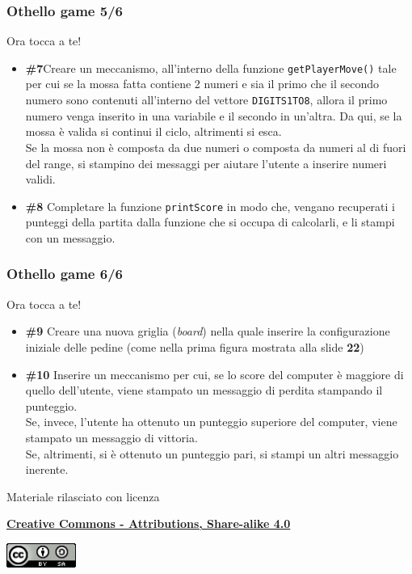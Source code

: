 \documentclass{beamer}
\begin{document}
\begin{frame}[fragile]
\frametitle{Othello game 5/6}
\begin{block}{Ora tocca a te!}
	\begin{itemize}
		\item \textbf{\#7}Creare un meccanismo, all'interno della funzione \texttt{getPlayerMove()} tale per cui se la mossa fatta contiene 2 numeri e sia il primo che il secondo numero sono contenuti all'interno del vettore \texttt{DIGITS1TO8}, allora il primo numero venga inserito in una variabile e il secondo in un'altra. Da qui, se la mossa è valida si continui il ciclo, altrimenti si esca.\\
		Se la mossa non è composta da due numeri o composta da numeri al di fuori del range, si stampino dei messaggi per aiutare l'utente a inserire numeri validi.
		\item \textbf{\#8} Completare la funzione \texttt{printScore} in modo che, vengano recuperati i punteggi della partita dalla funzione che si occupa di calcolarli, e li stampi con un messaggio.
	\end{itemize}
\end{block}
\end{frame}

\begin{frame}[fragile]
\frametitle{Othello game 6/6}
\begin{block}{Ora tocca a te!}
	\begin{itemize}
		\item \textbf{\#9} Creare una nuova griglia (\textit{board}) nella quale inserire la configurazione iniziale delle pedine (come nella prima figura mostrata alla slide \textbf{22})
		\item \textbf{\#10} Inserire un meccanismo per cui, se lo score del computer è maggiore di quello dell'utente, viene stampato un messaggio di perdita stampando il punteggio.\\
		Se, invece, l'utente ha ottenuto un punteggio superiore del computer, viene stampato un messaggio di vittoria.\\
		Se, altrimenti, si è ottenuto un punteggio pari, si stampi un altri messaggio inerente.
	\end{itemize}
\end{block}
\end{frame}

\begin{frame}

\begin{center}
	\bigskip
	Materiale rilasciato con licenza
	
	\textbf{\href{http://creativecommons.org/licenses/by-sa/4.0/}{Creative Commons - Attributions, Share-alike 4.0}}
	
	\medskip
	\includegraphics[height=0.8cm]{images/cc.jpeg}
\end{center}

\end{frame}	
\end{document}
